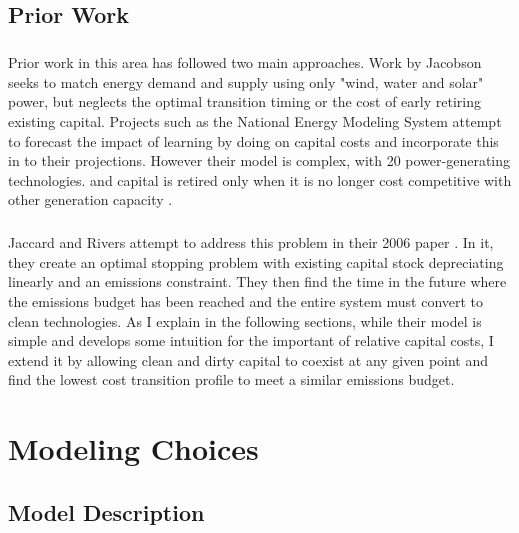 \documentclass{easychithesis}
\begin{document}
\section{Prior Work}

\paragraph{} Prior work in this area has followed two main approaches. Work by Jacobson \cite{Jacobson} seeks to match energy demand and supply using only "wind, water and solar" power, but neglects the optimal transition timing or the cost of early retiring existing capital. Projects such as the National Energy Modeling System attempt to forecast the impact of learning by doing on capital costs and incorporate this in to their projections. However their model is complex, with 20 power-generating technologies. and capital is retired only when it is no longer cost competitive with other generation capacity \cite{NEMS}. 

\paragraph{} Jaccard and Rivers attempt to address this problem in their 2006 paper \cite{JR2006}. In it, they create an optimal stopping problem with existing capital stock depreciating linearly and an emissions constraint. They then find the time in the future where the emissions budget has been reached and the entire system must convert to clean technologies. As I explain in the following sections, while their model is simple and develops some intuition for the important of relative capital costs, I extend it by allowing clean and dirty capital to coexist at any given point and find the lowest cost transition profile to meet a similar emissions budget. 




\chapter{Modeling Choices}
\section{Model Description}\label{sec:ModelDesc}
\end{document}
